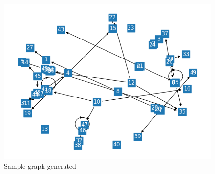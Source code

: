 \documentclass[letterpaper, 10 pt, proceedings]{ieeetran}  %
\begin{document}
	\begin{figure}
		\includegraphics[width=.5\textwidth]{samplegraph.png}
		\caption{Sample graph generated}
		\label{samplegraph}
	\end{figure}
	
	
	
%
	
	
\end{document}
